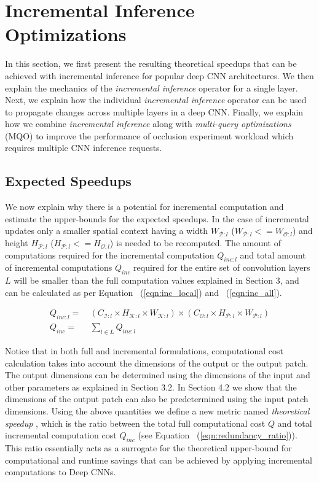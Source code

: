 \section{Incremental Inference Optimizations}\label{sec:optimizer}

In this section, we first present the resulting theoretical speedups that can be achieved with incremental inference for popular deep CNN architectures.
We then explain the mechanics of the \textit{incremental inference} operator for a single layer.
Next, we explain how the individual \textit{incremental inference} operator can be used to propagate changes across multiple layers in a deep CNN.
Finally, we explain how we combine \textit{incremental inference} along with \textit{multi-query optimizations} (MQO) to improve the performance of occlusion experiment workload which requires multiple CNN inference requests.

\subsection{Expected Speedups}
We now explain why there is a potential for incremental computation and estimate the upper-bounds for the expected speedups.
In the case of incremental updates only a smaller spatial context having a width $W_{\mathcal{P}:l}$ ($W_{\mathcal{P}:l}<=W_{\mathcal{O}:l}$) and height $H_{\mathcal{P}:l}$ ($H_{\mathcal{P}:l}<=H_{\mathcal{O}:l}$) is needed to be recomputed.
The amount of computations required for the incremental computation $Q_{inc:l}$ and total amount of incremental computations $Q_{inc}$ required for the entire set of convolution layers $L$ will be smaller than the full computation values explained in Section 3, and can be calculated as per Equation ~(\ref{eqn:inc_local}) and ~(\ref{eqn:inc_all}).

\begin{align}
\label{eqn:inc_local}
Q_{inc:l} =&~ (C_{\mathcal{I}:l} \times H_{\mathcal{K}:l} \times W_{\mathcal{K}:l}) \times (C_{\mathcal{O}:l} \times H_{\mathcal{P}:l} \times W_{\mathcal{P}:l})\\
\label{eqn:inc_all}
Q_{inc} =&~ \sum_{l \in L} Q_{inc:l}
\end{align}


Notice that in both full and incremental formulations, computational cost calculation takes into account the dimensions of the output or the output patch.
The output dimensions can be determined using the dimensions of the input and other parameters as explained in Section 3.2.
In Section 4.2 we show that the dimensions of the output patch can also be predetermined using the input patch dimensions.
Using the above quantities we define a new metric named \textit{theoretical speedup} , which is the ratio between the total full computational cost $Q$ and total incremental computation cost $Q_{inc}$ (see Equation ~(\ref{eqn:redundancy_ratio})).
This ratio essentially acts as a surrogate for the theoretical upper-bound for computational and runtime savings that can be achieved by applying incremental computations to Deep CNNs.

